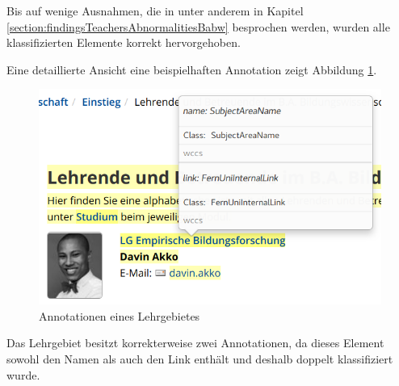     Bis auf wenige Ausnahmen, die in unter anderem in
    Kapitel \ref{section:findingsTeachersAbnormalitiesBabw} besprochen werden,
    wurden alle klassifizierten Elemente korrekt hervorgehoben.

    Eine detaillierte Ansicht eine beispielhaften Annotation zeigt
    Abbildung \ref{image:findingTeachersSubjectAreaAnnotations}.

    \begin{figure}[htb]
        \centering
        \includegraphics[scale=\screenshotScaleFactor]{../resources/findings/case-study-1/babw/annotations/double-lg-annotation.png}
        \caption{Annotationen eines Lehrgebietes}
        \label{image:findingTeachersSubjectAreaAnnotations}
    \end{figure}

    Das Lehrgebiet besitzt korrekterweise zwei Annotationen,
    da dieses Element sowohl den Namen als auch den Link enthält
    und deshalb doppelt klassifiziert wurde.